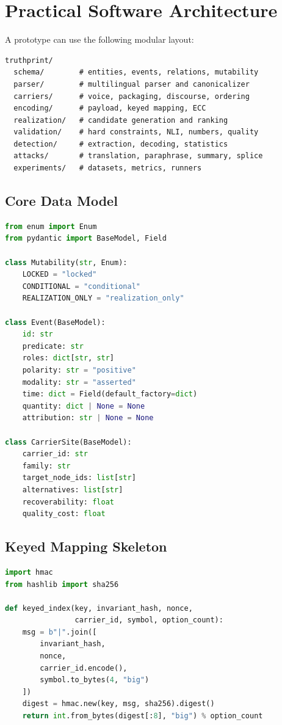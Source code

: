 \documentclass[journal]{IEEEtran}
\begin{document}
\section{Practical Software Architecture}
\label{app:arch}
A prototype can use the following modular layout:
\begin{lstlisting}
truthprint/
  schema/        # entities, events, relations, mutability
  parser/        # multilingual parser and canonicalizer
  carriers/      # voice, packaging, discourse, ordering
  encoding/      # payload, keyed mapping, ECC
  realization/   # candidate generation and ranking
  validation/    # hard constraints, NLI, numbers, quality
  detection/     # extraction, decoding, statistics
  attacks/       # translation, paraphrase, summary, splice
  experiments/   # datasets, metrics, runners
\end{lstlisting}

\subsection{Core Data Model}
\begin{lstlisting}[language=Python,caption={Illustrative Python data model.}]
from enum import Enum
from pydantic import BaseModel, Field

class Mutability(str, Enum):
    LOCKED = "locked"
    CONDITIONAL = "conditional"
    REALIZATION_ONLY = "realization_only"

class Event(BaseModel):
    id: str
    predicate: str
    roles: dict[str, str]
    polarity: str = "positive"
    modality: str = "asserted"
    time: dict = Field(default_factory=dict)
    quantity: dict | None = None
    attribution: str | None = None

class CarrierSite(BaseModel):
    carrier_id: str
    family: str
    target_node_ids: list[str]
    alternatives: list[str]
    recoverability: float
    quality_cost: float
\end{lstlisting}

\subsection{Keyed Mapping Skeleton}
\begin{lstlisting}[language=Python,caption={Secret-keyed carrier assignment skeleton.}]
import hmac
from hashlib import sha256

def keyed_index(key, invariant_hash, nonce,
                carrier_id, symbol, option_count):
    msg = b"|".join([
        invariant_hash,
        nonce,
        carrier_id.encode(),
        symbol.to_bytes(4, "big")
    ])
    digest = hmac.new(key, msg, sha256).digest()
    return int.from_bytes(digest[:8], "big") % option_count
\end{lstlisting}
\end{document}
